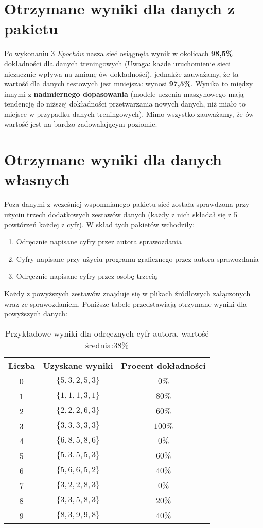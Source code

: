 \documentclass[a4paper,14pt]{report}
\begin{document}
\section{Otrzymane wyniki dla danych z pakietu}
	Po wykonaniu 3 \textit{Epochów} nasza sieć osiągnęła wynik w okolicach \textbf{98,5\%} dokładności dla danych treningowych (Uwaga: każde uruchomienie sieci niezacznie wpływa na zmianę ów dokładności), jednakże zauważamy, że ta wartość dla danych testowych jest mniejsza: wynosi \textbf{97,5\%}. Wynika to między innymi z \textbf{nadmiernego dopasowania} (modele uczenia maszynowego mają tendencję do niższej dokładności przetwarzania nowych danych, niż miało to miejsce w przypadku danych treningowych). Mimo wszystko zauważamy, że ów wartość jest na bardzo zadowalającym poziomie.
\section{Otrzymane wyniki dla danych własnych}
	Poza danymi z wcześniej wspomnianego pakietu sieć została sprawdzona przy użyciu trzech dodatkowych zestawów danych (każdy z nich składał się z 5 powtórzeń każdej z cyfr). W skład tych pakietów wchodziły:
	\begin{enumerate}
		\item Odręcznie napisane cyfry przez autora sprawozdania
		\item Cyfry napisane przy użyciu programu graficznego przez autora sprawozdania
		\item Odręcznie napisane cyfry przez osobę trzecią
	\end{enumerate}
	Każdy z powyższych zestawów znajduje się w plikach źródłowych załączonych wraz ze sprawozdaniem.
	Poniższe tabele przedstawiają otrzymane wyniki dla powyższych danych:
	\begin{table}[h!]
	\centering
	\begin{tabular}{|c | c | c |}
	 \hline
	 Liczba & Uzyskane wyniki & Procent dokładności \\
	 \hline\hline
	 0 & $\{5,3,2,5,3\}$ &  $0\%$ \\
	 1 & $\{1,1,1,3,1\}$ & $80\%$   \\
	 2 & $\{2,2,2,6,3\}$ & $60\%$   \\
	 3 & $\{3,3,3,3,3\}$ & $100\%$   \\
	 4 & $\{6,8,5,8,6\}$ & $0\%$   \\
	 5 & $\{5,3,5,5,3\}$ & $60\%$   \\
	 6 & $\{5,6,6,5,2\}$ & $40\%$   \\
	 7 & $\{3,2,2,8,3\}$ & $0\%$   \\
	 8 & $\{3,3,5,8,3\}$ & $20\%$   \\
	 9 & $\{8,3,9,9,8\}$ & $40\%$   \\
	 \hline
	\end{tabular}
	\caption{Przykładowe wyniki dla odręcznych cyfr autora, wartość średnia:38\%}
	\label{WynikiOdreczneAutor}
	\end{table}
\end{document}
